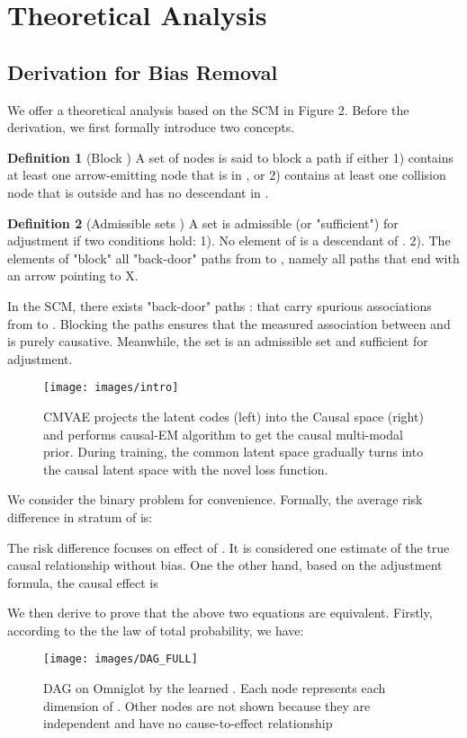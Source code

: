 \documentclass[letterpaper]{article} \usepackage{aaai23}  \usepackage{times}  \usepackage{helvet}  \usepackage{courier}  \usepackage[hyphens]{url}  \usepackage{graphicx} \urlstyle{rm} \def\UrlFont{\rm}  \usepackage{natbib}  \usepackage{caption} \frenchspacing  \setlength{\pdfpagewidth}{8.5in}  \setlength{\pdfpageheight}{11in}  \usepackage{algorithm}
\theoremstyle{plain}
\theoremstyle{definition}
\theoremstyle{remark}
\begin{document}
\section{Theoretical Analysis}

\subsection{Derivation for Bias Removal} 
We offer a theoretical analysis based on the SCM in Figure 2. Before the derivation, we first formally introduce two concepts.

\textbf{Definition 1} (Block \cite{glymour2016causal}) A set  of nodes is said to block a path  if either 1) 
contains at least one arrow-emitting node that is in , or 2)  contains at least one
collision node that is outside  and has no descendant in . 

\textbf{Definition 2} (Admissible sets \cite{pearl2000models}) A set  is admissible (or "sufficient") for adjustment if two conditions hold: 1). No element of  is a descendant of . 2). The elements of  "block" all "back-door" paths from  to , namely all paths that end with an arrow pointing to X.

In the SCM, there exists "back-door" paths :  that carry spurious associations from  to . Blocking the paths  ensures that the measured association between  and  is purely causative. Meanwhile, the set  is an admissible set and sufficient for adjustment. 

\begin{figure}
	\centering
	\texttt{[image: images/intro]}
	\caption{ CMVAE projects the latent codes (left) into the Causal space (right) and performs causal-EM algorithm to get the causal multi-modal prior. During training, the common latent space gradually turns into the causal latent space with the novel loss function.}	
	\label{fig:app_cmvae}
\end{figure}

We consider the binary problem for convenience. Formally, the average risk difference in stratum  of  is:


The risk difference focuses on effect of . It is considered one estimate of the true causal relationship without bias.
One the other hand, based on the adjustment formula, the causal effect is 
 
We then derive to prove that the above two equations are equivalent. Firstly, according to the the law of total probability, we have:


\begin{figure}
	\centering
	\texttt{[image: images/DAG\_FULL]}
	\caption{DAG on Omniglot by the learned . Each node represents each dimension of . Other nodes are not shown because they are independent and have no cause-to-effect relationship}	
	\label{fig:app_dag_full}
\end{figure}
\end{document}
